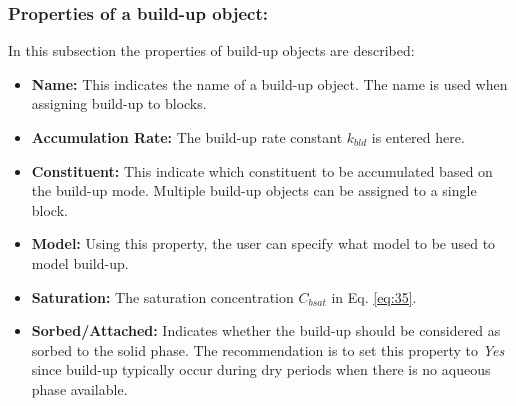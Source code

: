 \subsubsection{Properties of a build-up object: }
In this subsection the properties of build-up objects are described: 
\begin{itemize}
    
\item \textbf{Name: } This indicates the name of a build-up object. The name is used when assigning build-up to blocks. 
\item \textbf{Accumulation Rate: } The build-up rate constant $k_{bld}$ is entered here. 
\item \textbf{Constituent: } This indicate which constituent to be accumulated based on the build-up mode. Multiple build-up objects can be assigned to a single block. 
\item \textbf{Model: } Using this property, the user can specify what model to be used to model build-up. 
\item \textbf{Saturation: } The saturation concentration $C_{bsat}$ in Eq. \ref{eq:35}.
\item \textbf{Sorbed/Attached: } Indicates whether the build-up should be considered as sorbed to the solid phase. The recommendation is to set this property to \textit{Yes} since build-up typically occur during dry periods when there is no aqueous phase available. 
\end{itemize}
